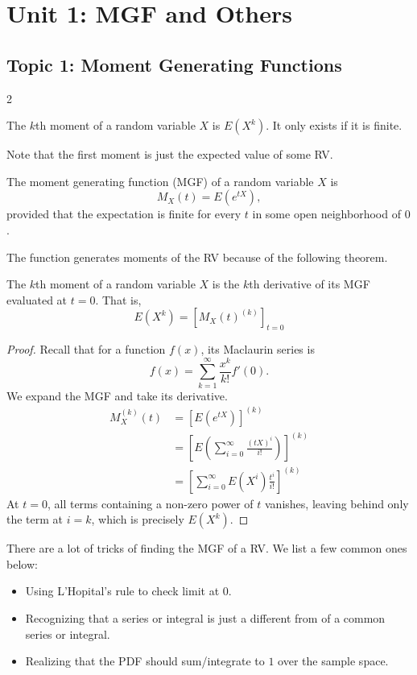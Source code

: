 \pagebreak
\section{Unit 1: MGF and Others }
\subsection{Topic 1: Moment Generating Functions}
\begin{multicols}{2}
\begin{definition}[Moment]
The $k$th moment of a random variable $X$ is $E(X^k)$. It only exists if it is finite. 
\end{definition}
Note that the first moment is just the expected value of some RV. 
\begin{definition}[MGF]
The moment generating function (MGF) of a random variable $X$ is 
$$
M_X(t) = E(e^{tX}),
$$
provided that the expectation is finite for every $t$ in some open neighborhood of $0$. 
\end{definition}
The function generates moments of the RV because of the following theorem. 
\begin{theorem}
The $k$th moment of a random variable $X$ is the $k$th derivative of its MGF evaluated at $t = 0$. That is, 
$$
E(X^k) = \left[M_X(t)^{(k)}\right]_{t = 0}
$$
\end{theorem}
\begin{proof}
Recall that for a function $f(x)$, its Maclaurin series is 
$$
f(x) = \sum_{k = 1}^\infty \frac{x^k}{k!}f'(0).
$$
We expand the MGF and take its derivative. 
\begin{align*}
    M_X^{(k)}(t) &= \left[E(e^{tX})\right]^{(k)} \\
    &= \left[E\left(\sum_{i = 0}^\infty \frac{(tX)^i}{i!}\right)\right]^{(k)} \\
    &= \left[\sum_{i = 0}^\infty E\left(X^i\right)\frac{t^i}{i!}\right]^{(k)}
\end{align*}
At $t = 0$, all terms containing a non-zero power of $t$ vanishes, leaving behind only the term at $i = k$, which is precisely $E(X^k)$. 
\end{proof}
\begin{remark}
There are a lot of tricks of finding the MGF of a RV. We list a few common ones below: 
\begin{itemize}
    \item Using L'Hopital's rule to check limit at $0$. 
    \item Recognizing that a series or integral is just a different from of a common series or integral. 
    \item Realizing that the PDF should sum/integrate to $1$ over the sample space. 
\end{itemize}
    

\end{remark}
\end{multicols}
